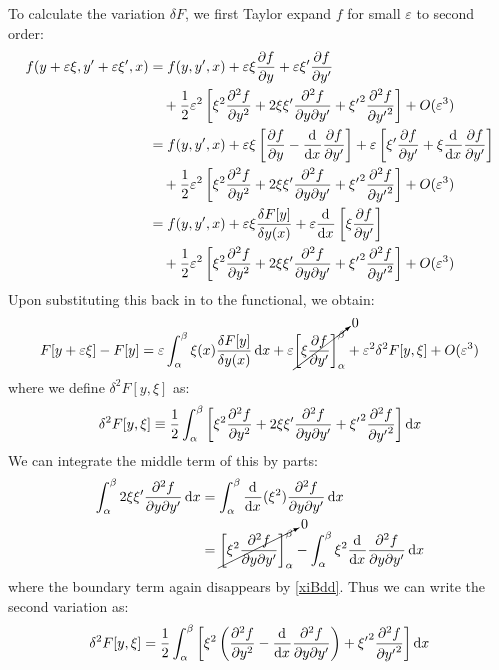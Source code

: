 \documentclass[../main.tex]{subfiles}
\begin{document}
To calculate the variation $\delta F$, we first Taylor expand $f$ for small $\varepsilon$ to second order:
\begin{align*}
  f(y + \varepsilon \xi, y' + \varepsilon \xi', x) &= f(y, y', x) + \varepsilon \xi \pderiv{f}{y} + \varepsilon \xi' \pderiv{f}{y'} \\
                                                   &\quad + \frac{1}{2} \varepsilon^2 \left[\xi^2 \pderiv[2]{f}{y} + 2 \xi \xi' \frac{\partial^2 f}{\partial y \partial y'} + {\xi'}^2 \pderiv[2]{f}{{y'}}\right] + O(\varepsilon^3) \\
                                                   &= f(y, y', x) + \varepsilon \xi\left[\pderiv{f}{y} - \deriv{}{x} \pderiv{f}{y'}\right] + \varepsilon \left[\xi' \pderiv{f}{y'} + \xi \deriv{}{x}\pderiv{f}{y'}\right] \\
                                                   &\quad + \frac{1}{2} \varepsilon^2 \left[\xi^2 \pderiv[2]{f}{y} + 2 \xi \xi' \frac{\partial^2 f}{\partial y \partial y'} + {\xi'}^2 \pderiv[2]{f}{{y'}}\right] + O(\varepsilon^3) \\
                                                   &= f(y, y', x) + \varepsilon \xi \frac{\delta F[y]}{\delta y(x)} + \varepsilon \deriv{}{x}\left[\xi \pderiv{f}{y'}\right] \\
                                                   &\quad + \frac{1}{2} \varepsilon^2 \left[\xi^2 \pderiv[2]{f}{y} + 2 \xi \xi' \frac{\partial^2 f}{\partial y \partial y'} + {\xi'}^2 \pderiv[2]{f}{{y'}}\right] + O(\varepsilon^3)
\end{align*}
Upon substituting this back in to the functional, we obtain:
\begin{equation}
  F[y + \varepsilon \xi] - F[y] = \varepsilon \int_{\alpha}^{\beta} \xi(x) \frac{\delta F[y]}{\delta y(x)} \d{x} + \varepsilon \cancelto{0}{\eval{\xi \pderiv{f}{y'}}{\alpha}{\beta}} + \varepsilon^2 \delta^2 F[y, \xi] + O(\varepsilon^3) \label{2ndVariationDiff}
\end{equation}
where we define $\delta^2 F[y, \xi]$ as:
\[
  \delta^2 F[y, \xi] \equiv \frac{1}{2} \int_{\alpha}^{\beta} \left[\xi^2 \pderiv[2]{f}{y} + 2\xi \xi' \frac{\partial^2 f}{\partial y \partial y'} + {\xi'}^2 \pderiv[2]{f}{{y'}}\right] \d{x}
\]
We can integrate the middle term of this by parts:
\begin{align*}
  \int_{\alpha}^{\beta} 2\xi\xi' \frac{\partial^2 f}{\partial y \partial y'} \d{x} &= \int_{\alpha}^{\beta} \deriv{}{x}(\xi^2) \frac{\partial^2 f}{\partial y \partial y'} \d{x} \\
                                                                                   &= \cancelto{0}{\eval{\xi^2 \frac{\partial^2 f}{\partial y \partial y'}}{\alpha}{\beta}} - \int_{\alpha}^{\beta} \xi^2 \deriv{}{x} \frac{\partial^2 f}{\partial y \partial y'} \d{x}
\end{align*}
where the boundary term again disappears by \cref{xiBdd}.
Thus we can write the second variation as:
\begin{equation}
  \delta^2 F[y, \xi] = \frac{1}{2}\int_{\alpha}^{\beta} \left[\xi^2 \left(\pderiv[2]{f}{y} - \deriv{}{x} \frac{\partial^2 f}{\partial y \partial y'}\right) + {\xi'}^2 \pderiv[2]{f}{{y'}}\right] \d{x} \label{2ndVariation}
\end{equation}
\end{document}
